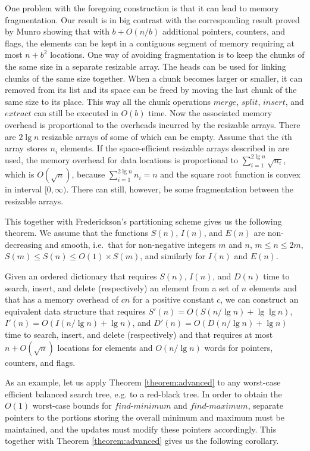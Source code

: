 \documentclass{DIKU-article}
\newcommand{\Findmin}{\mbox{$\mathit{find}$\textnormal{-}}\allowbreak{}\mbox{$\mathit{minimum}$}}
\newcommand{\Findmax}{\mbox{$\mathit{find}$\textnormal{-}}\allowbreak{}\mbox{$\mathit{maximum}$}}
\newcommand{\Insert}{\mbox{$\mathit{insert}$}}
\newcommand{\Extract}{\mbox{$\mathit{extract}$}}
\newcommand{\Merge}{\mbox{$\mathit{merge}$}}
\newcommand{\Split}{\mbox{$\mathit{split}$}}
\begin{document}
One problem with the foregoing construction is that it can lead to
memory fragmentation. Our result is in big contrast with the
corresponding result proved by Munro \cite{Mun86} showing that with $b
+ O(n/b)$ additional pointers, counters, and flags, the elements can
be kept in a contiguous segment of memory requiring at most $n + b^2$
locations. One way of avoiding fragmentation is to keep the chunks of
the same size in a separate resizable array. The heads can be used for
linking chunks of the same size together. When a chunk becomes larger
or smaller, it can removed from its list and its space can be freed by
moving the last chunk of the same size to its place. This way all the
chunk operations \Merge{}, \Split{}, \Insert{}, and \Extract{} can
still be executed in $O(b)$ time. Now the associated memory overhead
is proportional to the overheads incurred by the resizable arrays.
There are $2\lg n$ resizable arrays of some of which can be
empty. Assume that the $i$th array stores $n_i$ elements. If the
space-efficient resizable arrays described in \cite{BCDMS99,KM01} are
used, the memory overhead for data locations is proportional to
$\sum_{i=1}^{2\lg n} \sqrt{n_i}$, which is $O(\sqrt{n})$, because
$\sum_{i=1}^{2\lg n} n_i = n$ and the square root function is convex
in interval $[0, \infty)$.  There can still, however, be some
fragmentation between the resizable arrays.

This together with Frederickson's partitioning scheme gives us the following
theorem. We assume that the functions $S(n)$, $I(n)$, and $E(n)$ are
non-decreasing and smooth, i.e.~that for non-negative integers $m$ and
$n$, $m \le n \le 2m$, $S(m) \le S(n) \le O(1)\times S(m)$, and
similarly for $I(n)$ and $E(n)$.

\begin{theorem}
\label{theorem:advanced}
Given an ordered dictionary that requires
$S(n)$, $I(n)$, and $D(n)$ time to search, insert, and delete
(respectively) an element from a set of $n$ elements and that has a memory
overhead of $cn$ for a positive constant $c$, we can construct an equivalent
data structure that requires $S'(n) = O(S(n/\lg n)+\lg\lg n)$,
$I'(n)=O(I(n/\lg n)+\lg n)$, and $D'(n)=O(D(n/\lg n)+\lg n)$ time to
search, insert, and delete (respectively) and that requires at most $n
+ O(\sqrt{n})$ locations for elements and 
$O(n/\lg n)$ words for pointers, counters, and flags.
\end{theorem}

As an example, let us apply Theorem \ref{theorem:advanced} to any
worst-case efficient balanced search tree, e.g. to a red-black
tree. In order to obtain the $O(1)$ worst-case bounds for \Findmin{}
and \Findmax{}, separate pointers to the portions storing the overall
minimum and maximum must be maintained, and the updates must modify
these pointers accordingly.  This together with Theorem
\ref{theorem:advanced} gives us the following corollary.
\end{document}

